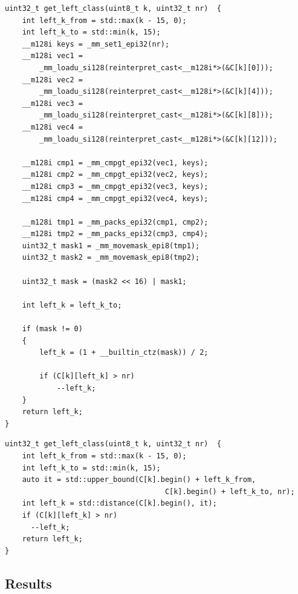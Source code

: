 \begin{lstlisting}
uint32_t get_left_class(uint8_t k, uint32_t nr)  {
	int left_k_from = std::max(k - 15, 0);
	int left_k_to = std::min(k, 15);
	__m128i keys = _mm_set1_epi32(nr);
	__m128i vec1 =
		_mm_loadu_si128(reinterpret_cast<__m128i*>(&C[k][0]));
	__m128i vec2 =
		_mm_loadu_si128(reinterpret_cast<__m128i*>(&C[k][4]));
	__m128i vec3 =
		_mm_loadu_si128(reinterpret_cast<__m128i*>(&C[k][8]));
	__m128i vec4 =
		_mm_loadu_si128(reinterpret_cast<__m128i*>(&C[k][12]));

	__m128i cmp1 = _mm_cmpgt_epi32(vec1, keys);
	__m128i cmp2 = _mm_cmpgt_epi32(vec2, keys);
	__m128i cmp3 = _mm_cmpgt_epi32(vec3, keys);
	__m128i cmp4 = _mm_cmpgt_epi32(vec4, keys);

	__m128i tmp1 = _mm_packs_epi32(cmp1, cmp2);
	__m128i tmp2 = _mm_packs_epi32(cmp3, cmp4);
	uint32_t mask1 = _mm_movemask_epi8(tmp1);
	uint32_t mask2 = _mm_movemask_epi8(tmp2);

	uint32_t mask = (mask2 << 16) | mask1;

	int left_k = left_k_to;

	if (mask != 0)
	{
		left_k = (1 + __builtin_ctz(mask)) / 2;

		if (C[k][left_k] > nr)
			--left_k;
	}
	return left_k;
}
\end{lstlisting}

\begin{lstlisting}
uint32_t get_left_class(uint8_t k, uint32_t nr)  {
	int left_k_from = std::max(k - 15, 0);
	int left_k_to = std::min(k, 15);
	auto it = std::upper_bound(C[k].begin() + left_k_from,
                                     C[k].begin() + left_k_to, nr);
    int left_k = std::distance(C[k].begin(), it);
    if (C[k][left_k] > nr)
      --left_k;
	return left_k;
}
\end{lstlisting}

\subsection{Results}

